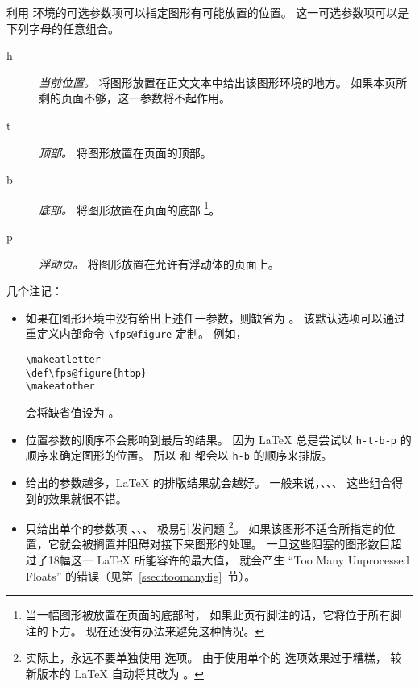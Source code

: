 利用  环境的可选参数项可以指定图形有可能放置的位置。
这一可选参数项可以是下列字母的任意组合。
\begin{description}
	\item [h] \emph{当前位置。} 
	将图形放置在正文文本中给出该图形环境的地方。
	如果本页所剩的页面不够，这一参数将不起作用。
	\item [t] \emph{顶部。} 将图形放置在页面的顶部。
	\item [b] \emph{底部。} 将图形放置在页面的底部
	\footnote{当一幅图形被放置在页面的底部时，
		如果此页有脚注的话，它将位于所有脚注的下方。
		现在还没有办法来避免这种情况。}。
	\item [p] \emph{ 浮动页。} 将图形放置在允许有浮动体的页面上。
\end{description}

几个注记：
\begin{itemize}
	\item 如果在图形环境中没有给出上述任一参数，则缺省为 \opt{[tbp]}。
	该默认选项可以通过重定义内部命令 \verb|\fps@figure| 定制。
	例如，
\begin{lstlisting}
\makeatletter
\def\fps@figure{htbp}
\makeatother
\end{lstlisting}
	会将缺省值设为 \opt{[htbp]}。
	
	\item 位置参数的顺序不会影响到最后的结果。
	因为 \LaTeX{} 总是尝试以 \texttt{h-t-b-p} 的顺序来确定图形的位置。
	所以 \opt{[hb]} 和 \opt{[bh]} 都会以 \texttt{h-b}	的顺序来排版。
	
	\item 给出的参数越多，\LaTeX{} 的排版结果就会越好。
	一般来说，\opt{[htbp]}、\opt{[tbp]}、\opt{[htp]}、\opt{[tp]} 这些组合得到的效果就很不错。
	
	\item 只给出单个的参数项 \opt{[t]}、\opt{[b]}、\opt{[p]}、\opt{[h]} 极易引发问题
	\footnote{实际上，永远不要单独使用 \opt{[h]} 选项。
		由于使用单个的 \opt{[h]} 选项效果过于糟糕，
		较新版本的 \LaTeX{} 自动将其改为 \opt{[ht]}。}。
	如果该图形不适合所指定的位置，它就会被搁置并阻碍对接下来图形的处理。
	一旦这些阻塞的图形数目超过了18幅这一 \LaTeX{} 所能容许的最大值，
	就会产生 ``Too Many Unprocessed Floats'' 的错误（见第~\ref{ssec:toomanyfig}~节）。
\end{itemize}


